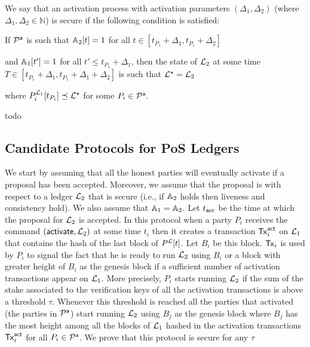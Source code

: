 \begin{definition}
 We say that an activation process with activation parameters $(\Delta_1,\Delta_2)$ (where $\Delta_1,\Delta_2\in\mathbb{N}$) is secure if the following condition is satisfied:

If $\mathcal{P}^\mathsf{a}$ is such that $\mathbb{A}_2[t]=1$ for all $t\in [t_{P_1}+\Delta_1, t_{P_1}+\Delta_2]$ %



	and $\mathbb{A}_1[t']=1$ for all $t' \leq t_{P_1}+\Delta_1$, then the state of $\mathcal{L}_2$ at some time $T\in [t_{P_1}+\Delta_1, t_{P_1}+\Delta_1+\Delta_2]$ is such that $\mathcal{L}^\star=\mathcal{L}_2$
	
	
	where $  P_i^{\mathcal{L}_1}[t_{P_i}] \preceq \mathcal{L}^\star$ for some $P_i\in\mathcal{P}^\mathsf{a}$.  
\end{definition}

\begin{definition}\label{def:genesis}
todo
\end{definition}

\subsection{Candidate Protocols for PoS Ledgers}
We start by assuming that all the honest parties will eventually activate if a proposal has been accepted. Moreover, we assume that the proposal is with
respect to a ledger $\mathcal{L}_2$ that is secure (i.e., if $\mathbb{A}_2$ holds then liveness and consistency hold). We also assume that $\mathbb{A}_1=\mathbb{A}_2$. Let $t_{\mathsf{acc}}$ be the time at which the proposal 
for $\mathcal{L}_2$ is accepted.
In this protocol when a party $P_i$ receives the command $(\mathsf{activate}, \mathcal{L}_2)$ at some time $t_i$ then it creates a transaction $\mathsf{Tx}^\mathsf{act}_i$ on $\mathcal{L}_1$ that contains the hash of the last block of $P^{\mathcal{L}}[t]$. Let $B_i$ be this block. $\mathsf{Tx}_i$ is used by $P_i$ to signal the fact that he is ready to run $\mathcal{L}_2$ using $B_i$ or a block
with greater height of $B_i$ as the genesis block if a sufficient number of activation transactions appear on $\mathcal{L}_1$. 
More precisely, $P_i$ starts running $\mathcal{L}_2$ if the sum of the stake associated to the
verification keys of all the activation transactions is above a threshold $\tau$. Whenever this threshold is reached all the parties that activated (the parties in $\mathcal{P}^\mathsf{a}$)
start running $\mathcal{L}_2$ using $B_j$ as the genesis block where $B_j$ has the most height among all the blocks of $\mathcal{L}_1$ hashed in the activation transactions $\mathsf{Tx}^\mathsf{act}_i$
for all $P_i\in\mathcal{P}^\mathsf{a}$.
We prove that this protocol is secure for any $\tau$ 

